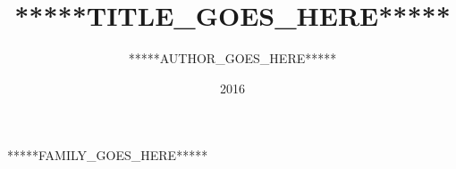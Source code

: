 \documentclass{book}
\title{*****TITLE_GOES_HERE*****}
\author{*****AUTHOR_GOES_HERE*****}
\date{2016}
\begin{document}
\frontmatter
\maketitle
\tableofcontents

\mainmatter

*****FAMILY_GOES_HERE*****
\end{document}
